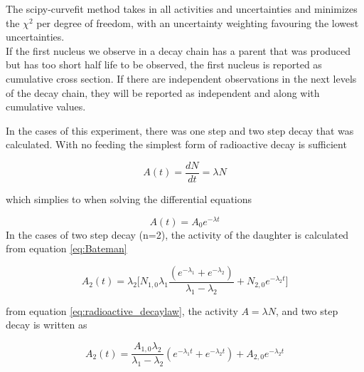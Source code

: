 \documentclass[a4paper,11pt,twoside]{book}
\begin{document}
\noindent
The scipy-curvefit method takes in all activities and uncertainties and minimizes the $\chi^2$ per degree of freedom, with an uncertainty weighting favouring the lowest uncertainties. \\


\noindent 
If the first nucleus we observe in a decay chain has a parent that was produced but has too short half life to be observed, the first nucleus is reported as cumulative cross section. If there are independent observations in the next levels of the decay chain, they will be reported as independent and along with cumulative values.  

\noindent 
In the cases of this experiment, there was one step and two step decay that was calculated. With no feeding the simplest form of radioactive decay is sufficient

\begin{equation} \label{eq:radioactive_decaylaw}
    A(t)=\frac{dN}{dt}= \lambda N
\end{equation}

\noindent which simplies to when solving the differential equations

\begin{equation} \label{eq:onestep_activity}
    A(t) = A_0 e^{-\lambda t}
\end{equation}
\noindent 
In the cases of two step decay (n=2), the activity of the daughter is calculated from equation \ref{eq:Bateman}

\begin{equation} \label{eq:twostep_activity}
    A_2(t)= \lambda_ 2 \Big[ N_{1,0}\lambda_1 \frac{(e^{-\lambda_1} + e^{-\lambda_2})}{\lambda_1 - \lambda_2} + N_{2,0}e^{-\lambda_2 t}  \Big]
\end{equation}

\noindent from equation \ref{eq:radioactive_decaylaw}, the activity $A=\lambda N$, and two step decay is written as 

\begin{equation}
    A_2(t) = \frac{A_{1,0}\lambda_2}{\lambda_1-\lambda_2 } (e^{-\lambda_1 t} + e^{-\lambda_2 t }) + A_{2,0}e^{-\lambda_2 t}
\end{equation}
\end{document}
